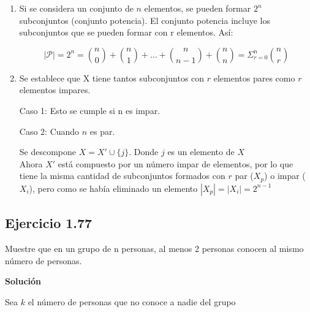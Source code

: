 \documentclass[12pt]{article}
\begin{document}
\begin{enumerate}
	
\item Si se considera un conjunto de $n$ elementos, se pueden formar $2^n$
subconjuntos (conjunto potencia). El conjunto potencia incluye los subconjuntos
que se pueden formar con r elementos. Así:

\begin{equation*}
	|\mathcal{P}|=2^n=\binom{n}{0}+\binom{n}{1}+...+\binom{n}{n-1}+\binom{n}{n}=\Sigma_{r=0}^{n} \binom{n}{r}
\end{equation*} 

\item Se establece que X tiene tantos subconjuntos con $r$ elementos pares como
$r$ elementos impares.

Caso 1: Esto se cumple si n es impar.
	
Caso 2: Cuando $n$ es par.

Se descompone $X=X'\cup \{j\}$. Donde $j$ es un elemento de $X$\\
	
Ahora $X'$ está compuesto por un n\'umero impar de elementos, por lo que tiene
la misma cantidad de subconjuntos formados con $r$ par ($X_p$) o impar ($X_i$),
pero como se había eliminado un elemento $|X_p|=|X_i|=2^{n-1}$

\end{enumerate}

\subsection*{Ejercicio 1.77}

Muestre que en un grupo de n personas, al menos 2 personas conocen al mismo
n\'umero de personas.

\textbf{Solución}

Sea $k$ el n\'umero de personas que no conoce a nadie del grupo
\end{document}
